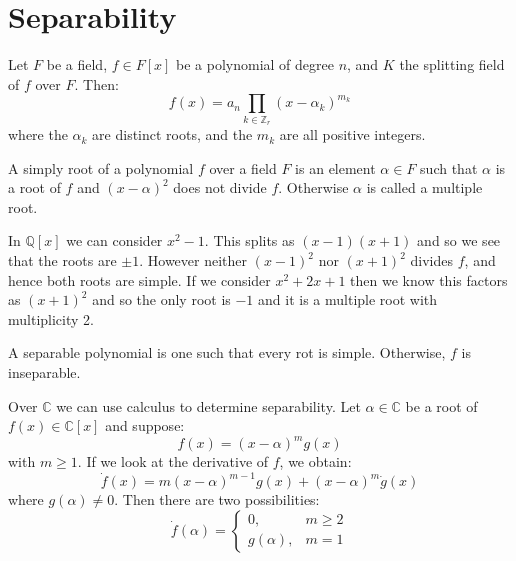 \section{Separability}
        Let $F$ be a field, $f\in{F}[x]$ be a polynomial of degree $n$, and
        $K$ the splitting field of $f$ over $F$. Then:
        \begin{equation}
            f(x)=a_{n}\prod_{k\in\mathbb{Z}_{r}}(x-\alpha_{k})^{m_{k}}
        \end{equation}
        where the $\alpha_{k}$ are distinct roots, and the $m_{k}$ are all
        positive integers.
        \begin{definition}
            A simply root of a polynomial $f$ over a field $F$ is an element
            $\alpha\in{F}$ such that $\alpha$ is a root of $f$ and
            $(x-\alpha)^{2}$ does not divide $f$. Otherwise $\alpha$ is
            called a multiple root.
        \end{definition}
        \begin{example}
            In $\mathbb{Q}[x]$ we can consider $x^{2}-1$. This splits as
            $(x-1)(x+1)$ and so we see that the roots are $\pm{1}$. However
            neither $(x-1)^{2}$ nor $(x+1)^{2}$ divides $f$, and hence both
            roots are simple. If we consider $x^{2}+2x+1$ then we know this
            factors as $(x+1)^{2}$ and so the only root is $\minus{1}$ and
            it is a multiple root with multiplicity 2.
        \end{example}
        \begin{definition}
            A separable polynomial is one such that every rot is simple.
            Otherwise, $f$ is inseparable.
        \end{definition}
        Over $\mathbb{C}$ we can use calculus to determine separability.
        Let $\alpha\in\mathbb{C}$ be a root of $f(x)\in\mathbb{C}[x]$ and
        suppose:
        \begin{equation}
            f(x)=(x-\alpha)^{m}g(x)
        \end{equation}
        with $m\geq{1}$. If we look at the derivative of $f$, we obtain:
        \begin{equation}
            \dot{f}(x)=m(x-\alpha)^{m-1}g(x)+(x-\alpha)^{m}\dot{g}(x)
        \end{equation}
        where $g(\alpha)\ne{0}$. Then there are two possibilities:
        \begin{equation}
            \dot{f}(\alpha)=
            \begin{cases}
                0,&m\geq{2}\\
                g(\alpha),&m=1
            \end{cases}
        \end{equation}
